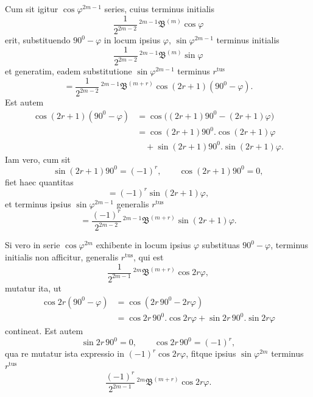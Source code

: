 \par\noindent{}%
\hspace*{\parindent}Cum sit igitur $\cos\varphi^{2m-1}$ series, cuius terminus initialis
\[
\frac{1}{2^{2m-2}}\,{}^{2m-1}\mathfrak{B}^{(m)}\cos\varphi
\]
erit, substituendo $90^0-\varphi$ in locum ipsius $\varphi$, $\sin\varphi^{2m-1}$
terminus initialis
\[
\frac{1}{2^{2m-2}}\,{}^{2m-1}\mathfrak{B}^{(m)}\sin\varphi
\]
et generatim, eadem substitutione $\sin\varphi^{2m-1}$ terminus $r^{\text{tus}}$
\[
= \frac{1}{2^{2m-2}}\,{}^{2m-1}\mathfrak{B}^{(m+r)}\cos(2r+1)(90^0-\varphi).
\]
Est autem
\[
\begin{aligned}
\cos(2r+1)(90^0-\varphi) &= \cos\big((2r+1)90^0 - (2r+1)\varphi\big)\\
&= \cos(2r+1)90^0 . \cos(2r+1)\varphi\\&\quad + \sin(2r+1)90^0 . \sin(2r+1)\varphi.
\end{aligned}
\]
Iam vero, cum sit
\[
\sin(2r+1)90^0 = (-1)^r, \qquad \cos(2r+1)90^0 = 0,
\]
fiet haec quantitas
\[
= (-1)^r\sin(2r+1)\varphi,
\]
et terminus ipsius $\sin\varphi^{2m-1}$ generalis $r^{\text{tus}}$
\[
= \frac{(-1)^r}{2^{2m-2}}\,{}^{2m-1}\mathfrak{B}^{(m+r)}\sin(2r+1)\varphi.
\]

Si vero in serie $\cos\varphi^{2m}$ exhibente in locum ipsius $\varphi$
substituas $90^0-\varphi$, terminus initialis non afficitur, generalis
$r^{\text{tus}}$, qui est
\[
\frac{1}{2^{2m-1}}\,{}^{2m}\mathfrak{B}^{(m+r)}\cos 2r\varphi,
\]
mutatur ita, ut
\[
\begin{aligned}
\cos 2r(90^0-\varphi) &= \cos(2r\,90^0 - 2r\varphi)\\
&= \cos 2r\,90^0 . \cos 2r\varphi + \sin 2r\,90^0 . \sin 2r\varphi
\end{aligned}
\]
contineat. Est autem
\[
\sin 2r\,90^0 = 0, \qquad \cos 2r\,90^0 = (-1)^r,
\]
qua re mutatur ista expressio in $(-1)^r\cos 2r\varphi$, fitque ipsius
$\sin\varphi^{2m}$ terminus $r^{\text{tus}}$
\[
\frac{(-1)^r}{2^{2m-1}}\,{}^{2m}\mathfrak{B}^{(m+r)}\cos 2r\varphi.
\]
